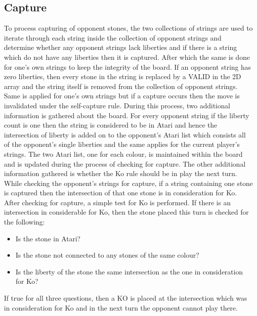 \documentclass{l4proj}
\begin{document}
\subsection{Capture}
To process capturing of opponent stones, the two collections of strings are used to iterate through each string inside the collection of opponent strings and determine whether any opponent strings lack liberties and if there is a string which do not have any liberties then it is captured. After which the same is done for one's own strings to keep the integrity of the board. If an opponent string has zero liberties, then every stone in the string is replaced by a VALID in the 2D array and the string itself is removed from the collection of opponent strings. Same is applied for one’s own strings but if a capture occurs then the move is invalidated under the self-capture rule.
During this process, two additional information is gathered about the board. For every opponent string if the liberty count is one then the string is considered to be in Atari and hence the intersection of liberty is added on to the opponent’s Atari list which consists all of the opponent’s single liberties and the same applies for the current player's strings. The two Atari list, one for each colour, is maintained within the board and is updated during the process of checking for capture.
The other additional information gathered is whether the Ko rule should be in play the next turn. While checking the opponent’s strings for capture, if a string containing one stone is captured then the intersection of that one stone is in consideration for Ko. After checking for capture, a simple test for Ko is performed. If there is an intersection in considerable for Ko, then the stone placed this turn is checked for the following:

\begin{itemize}
    \item Is the stone in Atari?
    \item Is the stone not connected to any stones of the same colour?
    \item Is the liberty of the stone the same intersection as the one in consideration for Ko?
\end{itemize}

If true for all three questions, then a KO is placed at the intersection which was in consideration for Ko and in the next turn the opponent cannot play there.
\end{document}
